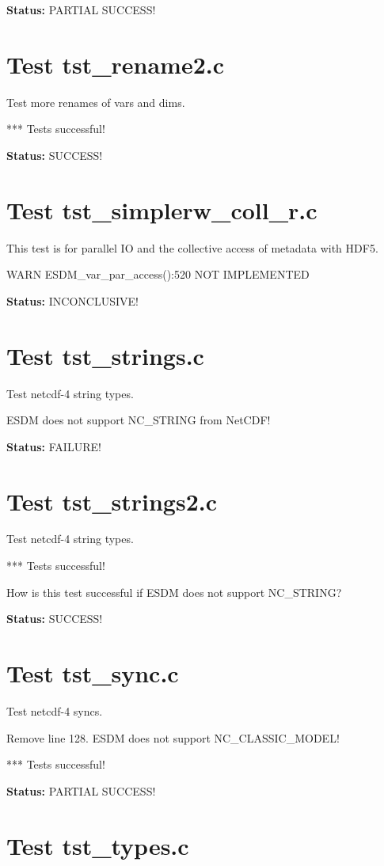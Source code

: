 {\bf \large Status: } PARTIAL SUCCESS!

\section{Test tst\_rename2.c}

Test more renames of vars and dims.

*** Tests successful!

{\bf \large Status: } SUCCESS!

\section{Test tst\_simplerw\_coll\_r.c}

This test is for parallel IO and the collective access of metadata with HDF5.

WARN ESDM\_var\_par\_access():520 NOT IMPLEMENTED

{\bf \large Status: } INCONCLUSIVE!

\section{Test tst\_strings.c}

Test netcdf-4 string types.

ESDM does not support NC\_STRING from NetCDF!

{\bf \large Status: } FAILURE!

\section{Test tst\_strings2.c}

Test netcdf-4 string types.

*** Tests successful!

How is this test successful if ESDM does not support NC\_STRING?

{\bf \large Status: } SUCCESS!

\section{Test tst\_sync.c}

Test netcdf-4 syncs.

Remove line 128. ESDM does not support NC\_CLASSIC\_MODEL!

*** Tests successful!

{\bf \large Status: } PARTIAL SUCCESS!

\section{Test tst\_types.c}

